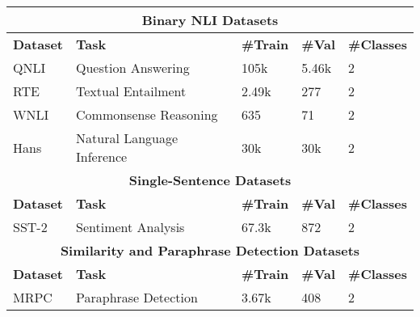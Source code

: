 \iffalse
\begin{table*}[t]
\centering
\begin{tabular}{lllll}
  \toprule
  \multicolumn{5}{c}{\textbf{Binary NLI Datasets}} \\
  \midrule
  \textbf{Dataset} & \textbf{Task} & \textbf{\#Train} & \textbf{\#Val} & \textbf{\#Classes} \\
  \midrule
  QNLI \citep{wang-etal-2018-glue} & Question Answering & 105k & 5.46k & 2\\
  RTE \tablefootnote{\citep{dagan2006pascal, bar2006second, giampiccolo2007third, bentivogli2009fifth}} & Textual Entailment & 2.49k & 277 & 2 \\
  WNLI \citep{levesque2011winograd} & Commonsense Reasoning & 635 & 71 & 2 \\
  Hans \citep{DBLP:journals/corr/abs-1902-01007} & Natural Language Inference & 30k & 30k & 2 \\
  \midrule
  \multicolumn{5}{c}{\textbf{Single-Sentence Datasets}} \\
  \midrule
  \textbf{Dataset} & \textbf{Task} & \textbf{\#Train} & \textbf{\#Val} & \textbf{\#Classes} \\
  \midrule
  SST-2 \citep{socher2013recursive} & Sentiment Analysis & 67.3k & 872 & 2 \\
  \midrule
  \multicolumn{5}{c}{\textbf{Similarity and Paraphrase Detection Datasets}} \\
  \midrule
  \textbf{Dataset} & \textbf{Task} & \textbf{\#Train} & \textbf{\#Val} & \textbf{\#Classes} \\
  \midrule
  MRPC \citep{dolan2004unsupervised} & Paraphrase Detection & 3.67k & 408 & 2 \\

\end{tabular}
\end{table*}
